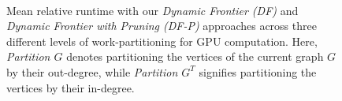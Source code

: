 \begin{figure}[!hbt]
  \centering
   \\[-2ex]
  \caption{Mean relative runtime with our \textit{Dynamic Frontier (DF)} and \textit{Dynamic Frontier with Pruning (DF-P)} approaches across three different levels of work-partitioning for GPU computation. Here, \textit{Partition $G$} denotes partitioning the vertices of the current graph $G$ by their out-degree, while \textit{Partition $G^T$} signifies partitioning the vertices by their in-degree.}
  \label{fig:adjust-partition}
\end{figure}
